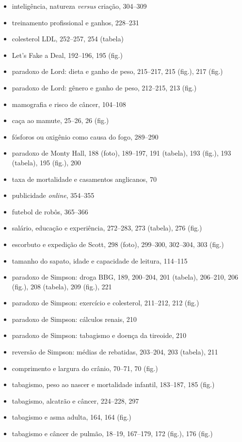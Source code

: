\documentclass[11pt,a5paper,twoside]{book}
\begin{document}
\begin{itemize}
\item inteligência, natureza \textit{versus} criação, 304–309
\item treinamento profissional e ganhos, 228–231
\item colesterol LDL, 252–257, 254 (tabela)
\item Let’s Fake a Deal, 192–196, 195 (fig.)
\item paradoxo de Lord: dieta e ganho de peso, 215–217, 215 (fig.), 217 (fig.)
\item paradoxo de Lord: gênero e ganho de peso, 212–215, 213 (fig.)
\item mamografia e risco de câncer, 104–108
\item caça ao mamute, 25–26, 26 (fig.)
\item fósforos ou oxigênio como causa do fogo, 289–290
\item paradoxo de Monty Hall, 188 (foto), 189–197, 191 (tabela), 193 (fig.), 193 (tabela), 195 (fig.), 200
\item taxa de mortalidade e casamentos anglicanos, 70
\item publicidade \textit{online}, 354–355
\item futebol de robôs, 365–366
\item salário, educação e experiência, 272–283, 273 (tabela), 276 (fig.)
\item escorbuto e expedição de Scott, 298 (foto), 299–300, 302–304, 303 (fig.)
\item tamanho do sapato, idade e capacidade de leitura, 114–115
\item paradoxo de Simpson: droga BBG, 189, 200–204, 201 (tabela), 206–210, 206 (fig.), 208 (tabela), 209 (fig.), 221
\item paradoxo de Simpson: exercício e colesterol, 211–212, 212 (fig.)
\item paradoxo de Simpson: cálculos renais, 210
\item paradoxo de Simpson: tabagismo e doença da tireoide, 210
\item reversão de Simpson: médias de rebatidas, 203–204, 203 (tabela), 211
\item comprimento e largura do crânio, 70–71, 70 (fig.)
\item tabagismo, peso ao nascer e mortalidade infantil, 183–187, 185 (fig.)
\item tabagismo, alcatrão e câncer, 224–228, 297
\item tabagismo e asma adulta, 164, 164 (fig.)
\item tabagismo e câncer de pulmão, 18–19, 167–179, 172 (fig.), 176 (fig.)

\end{itemize}
\end{document}
